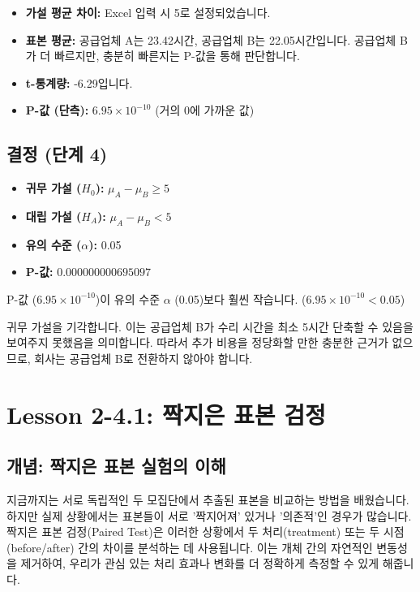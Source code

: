 \documentclass[11pt,a4paper]{book}
\theoremstyle{definition}
\begin{document}
\begin{itemize}
    \item \textbf{가설 평균 차이:} Excel 입력 시 5로 설정되었습니다.
    \item \textbf{표본 평균:} 공급업체 A는 23.42시간, 공급업체 B는 22.05시간입니다. 공급업체 B가 더 빠르지만, 충분히 빠른지는 P-값을 통해 판단합니다.
    \item \textbf{t-통계량:} -6.29입니다.
    \item \textbf{P-값 (단측):} $6.95 \times 10^{-10}$ (거의 0에 가까운 값)
\end{itemize}

\subsection{결정 (단계 4)}
\begin{itemize}
    \item \textbf{귀무 가설 ($H_0$):} $\mu_A - \mu_B \ge 5$
    \item \textbf{대립 가설 ($H_A$):} $\mu_A - \mu_B < 5$
    \item \textbf{유의 수준 ($\alpha$):} 0.05
    \item \textbf{P-값:} $0.000000000695097$
\end{itemize}
P-값 ($6.95 \times 10^{-10}$)이 유의 수준 $\alpha$ (0.05)보다 훨씬 작습니다.
($6.95 \times 10^{-10} < 0.05$)

\begin{summarybox}[title=결론]
귀무 가설을 기각합니다. 이는 공급업체 B가 수리 시간을 최소 5시간 단축할 수 있음을 보여주지 못했음을 의미합니다. 따라서 추가 비용을 정당화할 만한 충분한 근거가 없으므로, 회사는 공급업체 B로 전환하지 않아야 합니다.
\end{summarybox}


\section{Lesson 2-4.1: 짝지은 표본 검정}

\subsection{개념: 짝지은 표본 실험의 이해}
지금까지는 서로 독립적인 두 모집단에서 추출된 표본을 비교하는 방법을 배웠습니다. 하지만 실제 상황에서는 표본들이 서로 '짝지어져' 있거나 '의존적'인 경우가 많습니다. 짝지은 표본 검정(Paired Test)은 이러한 상황에서 두 처리(treatment) 또는 두 시점(before/after) 간의 차이를 분석하는 데 사용됩니다. 이는 개체 간의 자연적인 변동성을 제거하여, 우리가 관심 있는 처리 효과나 변화를 더 정확하게 측정할 수 있게 해줍니다.
\end{document}
